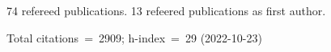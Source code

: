 74 refereed publications. 13 refeered publications as first author.

Total citations~=~2909; h-index~=~29 (2022-10-23)